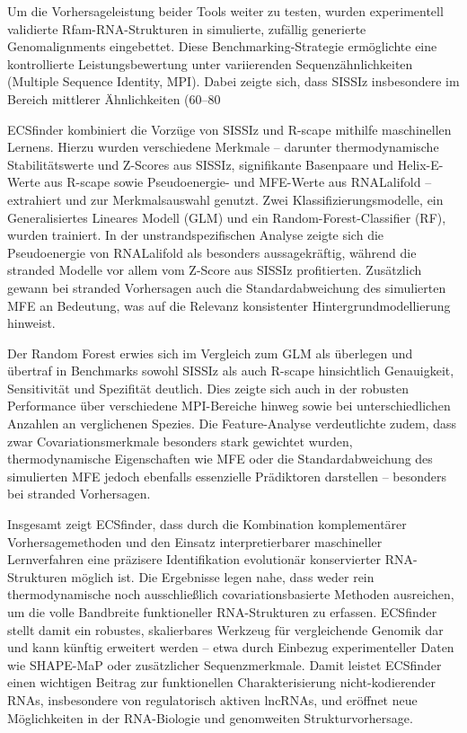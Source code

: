 \documentclass{article}
\begin{document}
\begin{large}
\begin{large}
\begin{large}
Um die Vorhersageleistung beider Tools weiter zu testen, wurden experimentell validierte Rfam-RNA-Strukturen in simulierte, zufällig generierte Genomalignments eingebettet. Diese Benchmarking-Strategie ermöglichte eine kontrollierte Leistungsbewertung unter variierenden Sequenzähnlichkeiten (Multiple Sequence Identity, MPI). Dabei zeigte sich, dass SISSIz insbesondere im Bereich mittlerer Ähnlichkeiten (60–80 %

ECSfinder kombiniert die Vorzüge von SISSIz und R-scape mithilfe maschinellen Lernens. Hierzu wurden verschiedene Merkmale – darunter thermodynamische Stabilitätswerte und Z-Scores aus SISSIz, signifikante Basenpaare und Helix-E-Werte aus R-scape sowie Pseudoenergie- und MFE-Werte aus RNALalifold – extrahiert und zur Merkmalsauswahl genutzt. Zwei Klassifizierungsmodelle, ein Generalisiertes Lineares Modell (GLM) und ein Random-Forest-Classifier (RF), wurden trainiert. In der unstrandspezifischen Analyse zeigte sich die Pseudoenergie von RNALalifold als besonders aussagekräftig, während die stranded Modelle vor allem vom Z-Score aus SISSIz profitierten. Zusätzlich gewann bei stranded Vorhersagen auch die Standardabweichung des simulierten MFE an Bedeutung, was auf die Relevanz konsistenter Hintergrundmodellierung hinweist.

Der Random Forest erwies sich im Vergleich zum GLM als überlegen und übertraf in Benchmarks sowohl SISSIz als auch R-scape hinsichtlich Genauigkeit, Sensitivität und Spezifität deutlich. Dies zeigte sich auch in der robusten Performance über verschiedene MPI-Bereiche hinweg sowie bei unterschiedlichen Anzahlen an verglichenen Spezies. Die Feature-Analyse verdeutlichte zudem, dass zwar Covariationsmerkmale besonders stark gewichtet wurden, thermodynamische Eigenschaften wie MFE oder die Standardabweichung des simulierten MFE jedoch ebenfalls essenzielle Prädiktoren darstellen – besonders bei stranded Vorhersagen.

Insgesamt zeigt ECSfinder, dass durch die Kombination komplementärer Vorhersagemethoden und den Einsatz interpretierbarer maschineller Lernverfahren eine präzisere Identifikation evolutionär konservierter RNA-Strukturen möglich ist. Die Ergebnisse legen nahe, dass weder rein thermodynamische noch ausschließlich covariationsbasierte Methoden ausreichen, um die volle Bandbreite funktioneller RNA-Strukturen zu erfassen. ECSfinder stellt damit ein robustes, skalierbares Werkzeug für vergleichende Genomik dar und kann künftig erweitert werden – etwa durch Einbezug experimenteller Daten wie SHAPE-MaP oder zusätzlicher Sequenzmerkmale. Damit leistet ECSfinder einen wichtigen Beitrag zur funktionellen Charakterisierung nicht-kodierender RNAs, insbesondere von regulatorisch aktiven lncRNAs, und eröffnet neue Möglichkeiten in der RNA-Biologie und genomweiten Strukturvorhersage.


\end{large}
\end{large}
\end{large}
\end{document}
